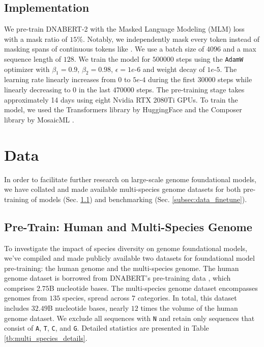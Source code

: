 \documentclass{article}
\begin{document}
\subsection{Implementation}
\label{subsec:model_implementation}
We pre-train DNABERT-2 with the Masked Language Modeling (MLM) loss with a mask ratio of $15\%$. 
Notably, we independently mask every token instead of masking spans of continuous tokens like \citet{dnabert}. We use a batch size of $4096$ and a max sequence length of $128$. We train the model for $500000$ steps using the \texttt{AdamW} \citep{adamw} optimizer with $\beta_1=0.9$, $\beta_2=0.98$, $\epsilon=1e\texttt{-}6$ and weight decay of $1e\texttt{-}5$. The learning rate linearly increases from $0$ to $5e\texttt{-}4$ during the first $30000$  steps while linearly decreasing to $0$ in the last  $470000$ steps. The pre-training stage takes approximately 14 days using eight Nvidia RTX 2080Ti GPUs. To train the model, we used the Transformers library by HuggingFace \citep{huggingface-transformers} and the Composer library by MosaicML \citep{mosaicml2022composer}.



\section{Data}
\label{sec:data}

In order to facilitate further research on large-scale genome foundational models, we have collated and made available multi-species genome datasets for both pre-training of models (Sec. \ref{subsec:data_pretrain}) and benchmarking (Sec. \ref{subsec:data_finetune}).

\subsection{Pre-Train: Human and Multi-Species Genome}
\label{subsec:data_pretrain}

To investigate the impact of species diversity on genome foundational models, we've compiled and made publicly available two datasets for foundational model pre-training: the human genome and the multi-species genome. The human genome dataset is borrowed from DNABERT's pre-training data \citep{dnabert}, which comprises $2.75$B nucleotide bases. The multi-species genome dataset encompasses genomes from $135$ species, spread across $7$ categories. In total, this dataset includes $32.49$B nucleotide bases, nearly $12$ times the volume of the human genome dataset. We exclude all sequences with \texttt{N} and retain only sequences that consist of \texttt{A}, \texttt{T}, \texttt{C}, and \texttt{G}. Detailed statistics are presented in Table \ref{tb:multi_species_details}.
\end{document}
